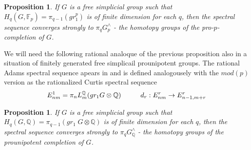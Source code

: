 \documentclass[11pt,a4paper]{article}
\newtheorem{proposition}[theorem]{Proposition}
\begin{document}
\begin{proposition}\label{q1}
If $G$ is a free simplicial group such that $H_q(G,\mathbb{F}_p)=\pi_{q-1}(gr^p_1)$ is of finite dimension for each $q$, then the spectral sequence converges strongly to $\pi_q G^{\wedge}_p$ - the homotopy groups of the pro-$p$-completion of $G$.
\end{proposition}
We will need the following rational analoque of the previous proposition also in a situation of finitely generated free simplicail prounipotent groups. The rational Adams spectral sequence apears in \cite[]{Qui5} and is defined analogousely with the $mod(p)$ version as the rationalized Curtis spectral sequence \cite{Cur}
$$E^1_{nm}=\pi_n L_m^{\mathbb{Q}}(gr_1 G\otimes\mathbb{Q}) \hspace{10mm} d_r: E^r_{nm} \rightarrow E^r_{n-1, m+r}$$ 
\begin{proposition}\label{q2}
If $G$ is a free simplicial group such that $H_q(G,\mathbb{Q})=\pi_{q-1}(gr_1\; G\otimes \mathbb{Q})$ is of finite dimension for each $q$, then the spectral sequence converges strongly to $\pi_q G^{\wedge}_{\mathbb{Q}}$ - the homotopy groups of the prounipotent completion of $G$.
\end{proposition}
\end{document}
